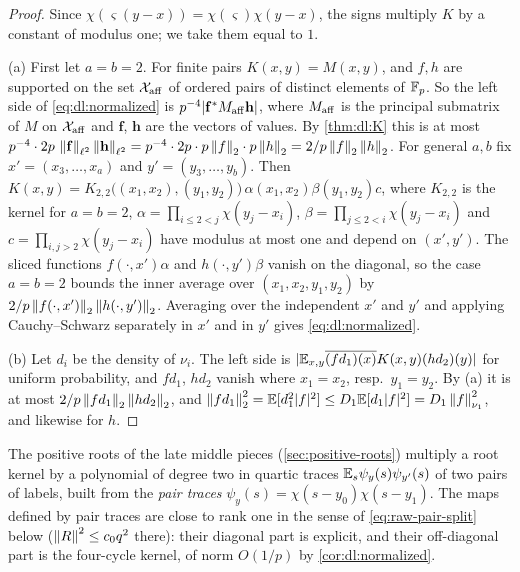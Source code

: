 \begin{proof}
Since $\chi(\varsigma(y-x))=\chi(\varsigma)\chi(y-x)$, the signs multiply $K$ by a
constant of modulus one; we take them equal to $1$.

(a) First let $a=b=2$. For finite pairs $K(x,y)=M(x,y)$, and $f,h$ are supported
on the set $\mathcal X_{\rm aff}$ of ordered pairs of distinct elements of
$\mathbb F_p$. So the left side of \eqref{eq:dl:normalized} is
$p^{-4}|\mathbf f^*M_{\rm aff}\mathbf h|$, where $M_{\rm aff}$ is the principal
submatrix of $M$ on $\mathcal X_{\rm aff}$ and $\mathbf f$, $\mathbf h$ are the
vectors of values. By \cref{thm:dl:K} this is at most
$p^{-4}\cdot2p\,\left\|\mathbf f\right\|_{\ell^2}\left\|\mathbf h\right\|_{\ell^2}
=p^{-4}\cdot2p\cdot p\left\|f\right\|_2\cdot p\left\|h\right\|_2=2/p\left\|f\right\|_2\left\|h\right\|_2$. For
general $a,b$ fix $x'=(x_3,\dots,x_a)$ and $y'=(y_3,\dots,y_b)$. Then
$K(x,y)=K_{2,2}\big((x_1,x_2),(y_1,y_2)\big)\,\alpha(x_1,x_2)\beta(y_1,y_2)c$,
where $K_{2,2}$ is the kernel for $a=b=2$, $\alpha=\prod_{i\le2<j}\chi(y_j-x_i)$,
$\beta=\prod_{j\le2<i}\chi(y_j-x_i)$ and $c=\prod_{i,j>2}\chi(y_j-x_i)$ have
modulus at most one and depend on $(x',y')$. The sliced functions
$f(\cdot,x')\alpha$ and $h(\cdot,y')\beta$ vanish on the diagonal, so the case
$a=b=2$ bounds the inner average over $(x_1,x_2,y_1,y_2)$ by
$2/p\left\|f(\cdot,x')\right\|_2\left\|h(\cdot,y')\right\|_2$. Averaging over the
independent $x'$ and $y'$ and applying Cauchy--Schwarz separately in $x'$ and in
$y'$ gives \eqref{eq:dl:normalized}.

(b) Let $d_i$ be the density of $\nu_i$. The left side is
$|\mathbb E_{x,y}\overline{(fd_1)(x)}K(x,y)(hd_2)(y)|$ for uniform probability, and
$fd_1$, $hd_2$ vanish where $x_1=x_2$, resp.\ $y_1=y_2$. By (a) it is at most
$2/p\left\|fd_1\right\|_2\left\|hd_2\right\|_2$, and
$\left\|fd_1\right\|_2^2=\mathbb E[d_1^2|f|^2]\le D_1\mathbb E[d_1|f|^2]=D_1\left\|f\right\|_{\nu_1}^2$, and
likewise for $h$.
\end{proof}

The positive roots of the late middle pieces (\cref{sec:positive-roots})
multiply a root kernel by a polynomial of degree two in quartic traces
$\mathbb E_s\psi_y(s)\psi_{y'}(s)$ of two pairs of labels, built from the \emph{pair
traces} $\psi_y(s)=\chi(s-y_0)\chi(s-y_1)$. The maps defined by pair traces are close to rank one in the sense of \eqref{eq:raw-pair-split} below ($\left\|R\right\|^2\le c_0q^2$ there): their diagonal part is explicit, and their off-diagonal part
is the four-cycle kernel, of norm $O(1/p)$ by \cref{cor:dl:normalized}.


